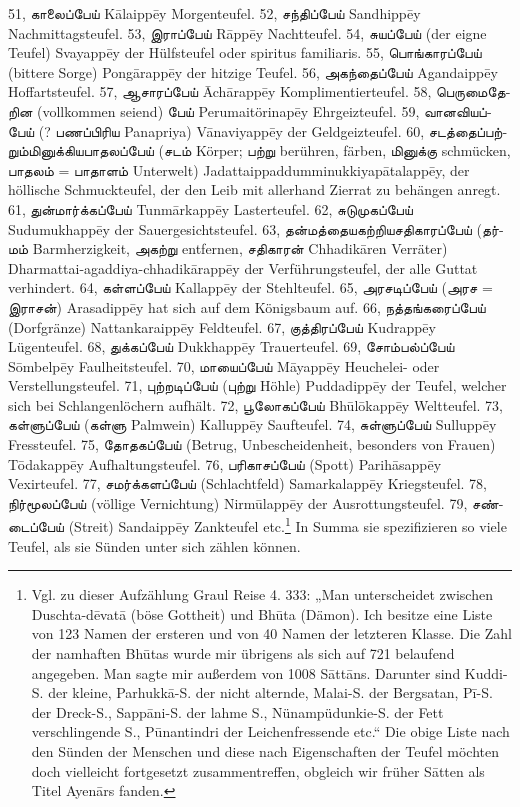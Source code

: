 \documentclass{article}
\newcommand{\TamilText}[1]{\texttamil{#1}}
\newcommand{\tam}[1]{\TamilText{#1}}
\begin{document}
51, \tam{காலைப்பேய்} K\={a}laipp\={e}y Morgenteufel. 52, \tam{சந்திப்பேய்} Sandhipp\={e}y Nachmittagsteufel. 53, \tam{இராப்பேய்} R\={a}pp\={e}y Nachtteufel. 54, \tam{சுயப்பேய்} (der eigne Teufel) Svayapp\={e}y der Hülfsteufel oder spiritus familiaris. 55, \tam{பொங்காரப்பேய்} (bittere Sorge) Pong\={a}rapp\={e}y der hitzige Teufel. 56, \tam{அகந்தைப்பேய்} Agandaipp\={e}y Hoffartsteufel. 57, \tam{ஆசாரப்பேய்} \={A}ch\={a}rapp\={e}y Komplimentierteufel. 58, \tam{பெருமைதேறின} (vollkommen seiend) \tam{பேய்} Perumaitörinap\={e}y Ehrgeizteufel. 59, \tam{வானவியப்பேய்} (? \tam{பணப்பிரிய} Panapriya) V\={a}naviyapp\={e}y der Geldgeizteufel. 60, \tam{சடத்தைப்பற்றும்மினுக்கியபாதலப்பேய்} (\tam{சடம்} Körper; \tam{பற்று} berühren, färben, \tam{மினுக்கு} schmücken, \tam{பாதலம்} = \tam{பாதாளம்} Unterwelt) Jadattaippaddumminukkiyap\={a}talapp\={e}y, der höllische Schmuckteufel, der den Leib mit allerhand Zierrat zu behängen anregt. 61, \tam{துன்மார்க்கப்பேய்} Tunm\={a}rkapp\={e}y Lasterteufel. 62, \tam{சுடுமுகப்பேய்} Sudumukhapp\={e}y der Sauergesichtsteufel. 63, \tam{தன்மத்தையகற்றியசதிகாரப்பேய்} (\tam{தர்மம்} Barmherzigkeit, \tam{அகற்று} entfernen, \tam{சதிகாரன்} Chhadik\={a}ren Verräter) Dharmattai-agaddiya-chhadik\={a}rapp\={e}y der Verführungsteufel, der alle Guttat verhindert. 64, \tam{கள்ளப்பேய்} Kallapp\={e}y der Stehlteufel. 65, \tam{அரசடிப்பேய்} (\tam{அரச} = \tam{இராசன்}) Arasadipp\={e}y hat sich auf dem Königsbaum auf. 66, \tam{நத்தங்கரைப்பேய்} (Dorfgränze) Nattankaraipp\={e}y Feldteufel. 67, \tam{குத்திரப்பேய்} Kudrapp\={e}y Lügenteufel. 68, \tam{துக்கப்பேய்} Dukkhapp\={e}y Trauerteufel. 69, \tam{சோம்பல்ப்பேய்} S\={o}mbelp\={e}y Faulheitsteufel. 70, \tam{மாயைப்பேய்} M\={a}yapp\={e}y Heuchelei- oder Verstellungsteufel. 71, \tam{புற்றடிப்பேய்} (\tam{புற்று} Höhle) Puddadipp\={e}y der Teufel, welcher sich bei Schlangenlöchern aufhält. 72, \tam{பூலோகப்பேய்} Bh\={u}l\={o}kapp\={e}y Weltteufel. 73, \tam{கள்ளுப்பேய்} (\tam{கள்ளு} Palmwein) Kallupp\={e}y Saufteufel. 74, \tam{சுள்ளுப்பேய்} Sullupp\={e}y Fressteufel. 75, \tam{தோதகப்பேய்} (Betrug, Unbescheidenheit, besonders von Frauen) T\={o}dakapp\={e}y Aufhaltungsteufel. 76, \tam{பரிகாசப்பேய்} (Spott) Parih\={a}sapp\={e}y Vexirteufel. 77, \tam{சமர்க்களப்பேய்} (Schlachtfeld) Samarkalapp\={e}y Kriegsteufel. 78, \tam{நிர்மூலப்பேய்} (völlige Vernichtung) Nirm\={u}lapp\={e}y der Ausrottungsteufel. 79, \tam{சண்டைப்பேய்} (Streit) Sandaipp\={e}y Zankteufel etc.\footnote{Vgl. zu dieser Aufzählung Graul Reise 4. 333: „Man unterscheidet zwischen Duschta-d\={e}vat\={a} (böse Gottheit) und Bh\={u}ta (Dämon). Ich besitze eine Liste von 123 Namen der ersteren und von 40 Namen der letzteren Klasse. Die Zahl der namhaften Bh\={u}tas wurde mir übrigens als sich auf 721 belaufend angegeben. Man sagte mir außerdem von 1008 S\={a}tt\={a}ns. Darunter sind Kuddi-S. der kleine, Parhukk\={a}-S. der nicht alternde, Malai-S. der Bergsatan, P\={i}-S. der Dreck-S., Sapp\={a}ni-S. der lahme S., Nünampüdunkie-S. der Fett verschlingende S., P\={u}nantindri der Leichenfressende etc.“ Die obige Liste nach den Sünden der Menschen und diese nach Eigenschaften der Teufel möchten doch vielleicht fortgesetzt zusammentreffen, obgleich wir früher S\={a}tten als Titel Ayen\={a}rs fanden.} In Summa sie spezifizieren so viele Teufel, als sie Sünden unter sich zählen können.
\end{document}
